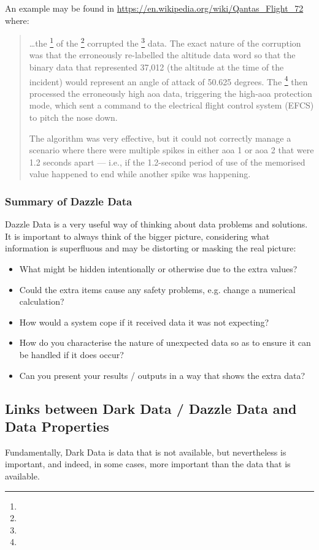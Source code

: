 An example may be found in
\href{https://en.wikipedia.org/wiki/Qantas\_Flight\_72}{https://en.wikipedia.org/wiki/Qantas\_Flight\_72}
where:
\begin{quotation}
  \dots the \footnote{} of the \footnote{} corrupted the \footnote{} data. The exact nature of the corruption was that the   erroneously re-labelled the altitude data word so that the binary data that represented 37,012 (the altitude at the time of the incident) would represent an angle of attack of 50.625 degrees. The \footnote{} then processed the erroneously high \gls{aoa} data, triggering the high-\gls{aoa} protection mode, which sent a command to the electrical flight control system (EFCS) to pitch the nose down.
  
  The  algorithm was very effective, but it could not correctly manage a scenario where there were multiple spikes in either \gls{aoa} 1 or \gls{aoa} 2 that were 1.2 seconds apart --- i.e., if the 1.2-second period of use of the memorised value happened to end while another spike was happening.
  \end{quotation}
\subsubsection{Summary of Dazzle Data}
Dazzle Data is a very useful way of thinking about data problems and solutions.
It is important to always think of the bigger picture,
considering what information is superfluous and may be distorting or masking the real picture:
\begin{itemize}
    \item What might be hidden intentionally or otherwise due to the extra values?
    \item Could the extra items cause any safety problems, e.g. change a numerical calculation?
    \item How would a system cope if it received data it was not expecting?
    \item How do you characterise the nature of unexpected data so as to ensure it can be handled if it does occur?
    \item Can you present your results / outputs in a way that shows the extra data?
\end{itemize}
%
%
\subsection{Links between Dark Data / Dazzle Data and Data Properties}
Fundamentally, Dark Data is data that is not available, but nevertheless is important, and indeed, in some cases, more important than the data that is available.

